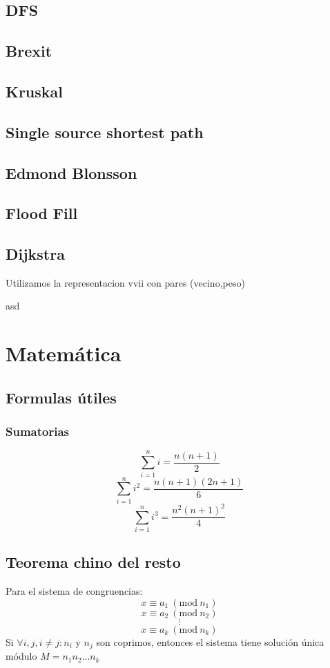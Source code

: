 \documentclass[oneside]{book}
\newcommand{\Mod}[1]{\ (\mathrm{mod}\ #1)}
\begin{document}
	\section{DFS}
	
	\section{Brexit}
	
	\section{Kruskal}
	
	\section{Single source shortest path}
	\section{Edmond Blonsson}
	
	\section{Flood Fill}
	
	\section{Dijkstra}
	Utilizamos la representacion vvii con pares (vecino,peso)
	\begin{codigo}
	asd
	\end{codigo}
	\chapter{Matem\'atica}
	\section{Formulas \'utiles}
	\subsection{Sumatorias}
		\[\sum_{i=1}^{n}i=\frac{n(n+1)}{2}\]
		\[\sum_{i=1}^{n}i^2=\frac{n(n+1)(2n+1)}{6}\]
		\[\sum_{i=1}^{n}i^3=\frac{n^2(n+1)^2}{4}\]
	\section{Teorema chino del resto}
	Para el sistema de congruencias:
	\[x\equiv a_1 \Mod {n_1} \]
	\[x\equiv a_2 \Mod {n_2} \]
	\[\vdots\]
	\[x\equiv a_k \Mod {n_k} \]
	Si $\forall i,j, i\neq j: n_i$ y $n_j$ son coprimos, entonces el sistema tiene soluci\'on \'unica m\'odulo $M=n_1n_2...n_k$
\end{document}
